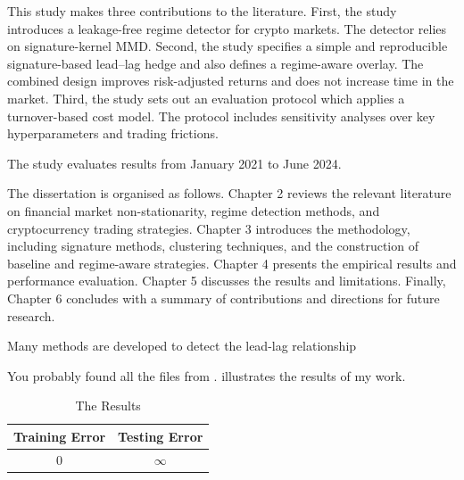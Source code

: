 This study makes three contributions to the literature.
First, the study introduces a leakage-free regime detector for crypto markets. The detector relies on signature-kernel MMD.
Second, the study specifies a simple and reproducible signature-based lead–lag hedge and also defines a regime-aware overlay. The combined design improves risk-adjusted returns and does not increase time in the market.
Third, the study sets out an evaluation protocol which applies a turnover-based cost model. The protocol includes sensitivity analyses over key hyperparameters and trading frictions.

The study evaluates results from January 2021 to June 2024. %

The dissertation is organised as follows. Chapter 2 reviews the relevant literature on financial market non-stationarity, regime detection methods, and cryptocurrency trading strategies. Chapter 3 introduces the methodology, including signature methods, clustering techniques, and the construction of baseline and regime-aware strategies. Chapter 4 presents the empirical results and performance evaluation. Chapter 5 discusses the results and limitations. Finally, Chapter 6 concludes with a summary of contributions and directions for future research.


\iffalse
Many methods are developed to detect the lead-lag relationship

You probably found all the files from \cite{Gunn:2001:pdflatex}.
 illustrates the results of my work.
\begin{table}[!htb]
  \centering
  \begin{tabular}{cc}
  \toprule
  \textbf{Training Error} & \textbf{Testing Error}\\
  \midrule
  0 & $\infty$\\
  \bottomrule
  \end{tabular}
  \caption{The Results}
  \label{Table:tabex}
\end{table}

